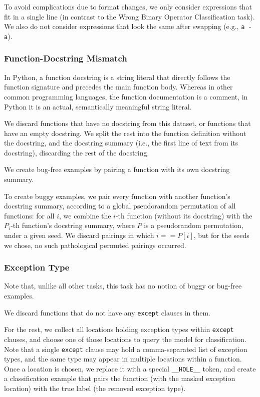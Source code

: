 \documentclass{article}
\begin{document}
To avoid complications due to format changes, we only consider expressions that fit in a single line (in contrast to the Wrong Binary Operator Classification task). We also do not consider expressions that look the same after swapping (e.g., \texttt{a - a}).

\subsubsection{Function-Docstring Mismatch}
In Python, a function docstring is a string literal that directly follows the function signature and precedes the main function body. Whereas in other common programming languages, the function documentation is a comment, in Python it is an actual, semantically meaningful string literal.

We discard functions that have no docstring from this dataset, or functions that have an empty docstring. We split the rest into the function definition without the docstring, and the docstring summary (i.e., the first line of text from its docstring), discarding the rest of the docstring.

We create bug-free examples by pairing a function with its own docstring summary.

To create buggy examples, we pair every function with another function's docstring summary, according to a global pseudorandom permutation of all functions: for all $i$, we combine the $i$-th function (without its docstring) with the $P_i$-th function's docstring summary, where $P$ is a pseudorandom permutation, under a given seed. We discard pairings in which $i == P[i]$, but for the seeds we chose, no such pathological permuted pairings occurred.

\subsubsection{Exception Type}
Note that, unlike all other tasks, this task has no notion of buggy or bug-free examples.

We discard functions that do not have any \texttt{except} clauses in them.

For the rest, we collect all locations holding exception types within 
\texttt{except} clauses, and choose one of those locations to query the model for classification. Note that a single \texttt{except} clause may hold a comma-separated list of exception types, and the same type may appear in multiple locations within a function. Once a location is chosen, we replace it with a special \texttt{\_\_HOLE\_\_} token, and create a classification example that pairs the function (with the masked exception location) with the true label (the removed exception type).
\end{document}
